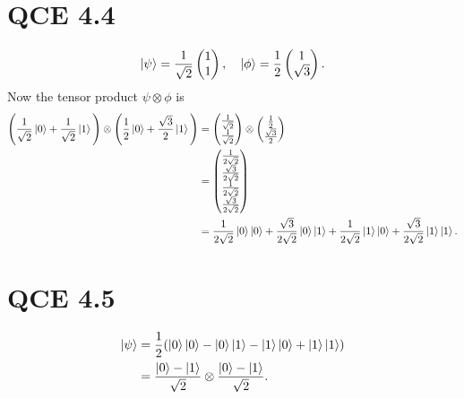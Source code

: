 \documentclass[10pt]{article}
\begin{document}
\section*{QCE 4.4}
\[
\ket{\psi} = \frac{1}{\sqrt{2}} \begin{pmatrix}
1 \\
1
\end{pmatrix}, \quad \ket{\phi} = \frac{1}{2} \begin{pmatrix}
1 \\
\sqrt{3}
\end{pmatrix}.
\]
Now the tensor product $\psi \otimes \phi$ is 
\begin{align*}
\Bigg( \frac{1}{\sqrt{2}} \ket{0} + \frac{1}{\sqrt{2}} \ket{1} \Bigg) \otimes \Bigg( \frac{1}{2} \ket{0} + \frac{\sqrt{3}}{2} \ket{1} \Bigg) &=
\begin{pmatrix}
\frac{1}{\sqrt{2}} \\
\frac{1}{\sqrt{2}} 
\end{pmatrix}
\otimes 
\begin{pmatrix}
\frac{1}{2} \\
\frac{\sqrt{3}}{2}
\end{pmatrix} \\
   &=
\begin{pmatrix}
\frac{1}{2\sqrt{2}}  \\
\frac{\sqrt{3}}{2 \sqrt{2}}  \\
\frac{1}{2\sqrt{2}}  \\
\frac{\sqrt{3}}{2\sqrt{2}}
\end{pmatrix} \\
  &= 
\frac{1}{2\sqrt{2}} \ket{0} \ket{0} + \frac{\sqrt{3}}{2\sqrt{2}} \ket{0} \ket{1} + \frac{1}{2\sqrt{2}} \ket{1} \ket{0} + \frac{\sqrt{3}}{2\sqrt{2}} \ket{1} \ket{1}.
\end{align*}

\section*{QCE 4.5}
\begin{align*}
\ket{\psi} &= \frac{1}{2} ( \ket{0} \ket{0} - \ket{0} \ket{1} - \ket{1} \ket{0} + \ket{1} \ket{1} ) \\
				&= \frac{ \ket{ 0 } - \ket{ 1 } }{\sqrt{2}} \otimes \frac{ \ket{ 0 } - \ket{ 1 } }{\sqrt{2}}.
\end{align*}
\end{document}
